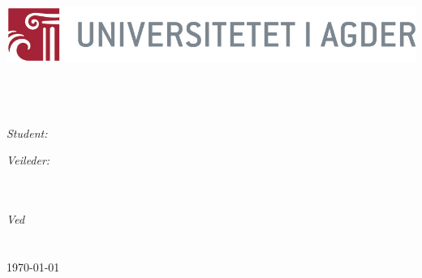 \documentclass[11pt, oneside]{Thesis} %
\begin{document}
\begin{titlepage}
\begin{center}

\includegraphics[scale=1.5]{logo} \\[1.5cm]
\HRule \\[0.4cm] %
{\huge \bfseries \ttitle}\\[0.4cm] %
\HRule \\[1.5cm] %
 
\begin{minipage}{0.4\textwidth}
\begin{flushleft} \large
\emph{Student:}\\
{\authornames} %
\end{flushleft}
\end{minipage}
\begin{minipage}{0.4\textwidth}
\begin{flushright} \large
\emph{Veileder:} \\
{\supname}\\ %

\end{flushright}
\end{minipage}\\[3cm]
 

\textit{Ved}\\[0.4cm]
\groupname\\\univname\\[4cm] %
 
{\large \today}\\[4cm] %
 
\vfill
\end{center}


\end{titlepage}


\end{document}
